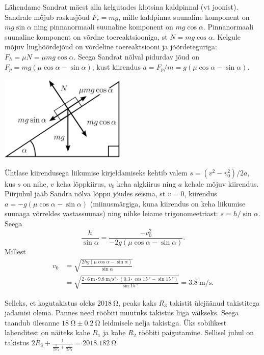 \documentclass[10pt]{article}
\begin{document}
\solu
Lähendame Sandrat mäest alla kelgutades klotsina kaldpinnal (vt joonist). Sandrale mõjub raskusjõud $F_r=mg$, mille kaldpinna suunaline komponent on $mg\sin\alpha$ ning pinnanormaali suunaline komponent on $mg\cos\alpha$. Pinnanormaali suunaline komponent on võrdne toereaktsiooniga, st $N=mg\cos\alpha$. Kelgule mõjuv liughõõrdejõud on võrdeline toereaktsiooni ja jõõrdeteguriga: $F_h=\mu N=\mu mg\cos\alpha$. Seega Sandrat nõlval pidurdav jõud on $F_p = mg(\mu \cos\alpha - \sin\alpha)$, kust kiirendus $a=F_p/m=g(\mu \cos\alpha - \sin\alpha)$.
\begin{center}
\includegraphics[width=0.45\textwidth]{2024-v3g-01-yl.png}
\end{center}
Ühtlase kiirendusega liikumise kirjeldamiseks kehtib valem $s=(v^2-v_0^2)/2a$, kus $s$ on nihe, $v$ keha lõppkiirus, $v_0$ keha algkiirus ning $a$ kehale mõjuv kiirendus. Piirjuhul jääb Sandra nõlva lõppu jõudes seisma, st $v=0$, kiirendus $a=-g(\mu \cos\alpha - \sin\alpha)$ (miinusmärgiga, kuna kiirendus on keha liikumise suunaga võrreldes vastassuunas) ning nihke leiame trigonomeetriast: $s=h/\sin\alpha$. Seega
\[
  \frac{h}{\sin\alpha} = \frac{-v_0^2}{-2g(\mu \cos\alpha - \sin\alpha)}.
\]
Millest
\begin{align*}
  v_0 &= \sqrt{\frac{2hg(\mu \cos\alpha - \sin\alpha)}{\sin\alpha}}\\
  &= \sqrt{\frac{2\cdot\SI{6}{\m}\cdot \SI{9.8}{\m\per\s\squared}  \cdot (0.3\cdot \cos \SI{15}{\degree}  - \sin\SI{15}{\degree})}{\sin\SI{15}{\degree}}} = \SI{3.8}{\m\per\s}.
\end{align*}
\probend
\bigskip


\solu
Selleks, et kogutakistus oleks $\SI{2018}{\ohm}$, peaks kaks $R_3$ takistit ülejäänud takistitega jadamisi olema. Pannes need rööbiti muutuks takistus liiga väikseks. Seega taandub ülesanne $\SI{18}{\ohm}\pm\SI{0.2}{\ohm}$ leidmisele nelja takistiga. Üks sobilikest lahenditest on näiteks kahe $R_1$ ja kahe $R_2$ rööbiti paigutamine. Sellisel juhul on takistus $2R_3 + \frac{1}{\frac{1}{2R_1} + \frac{1}{2R_2}} = \SI{2018.182}{\ohm}$
\probend
\bigskip
\end{document}

